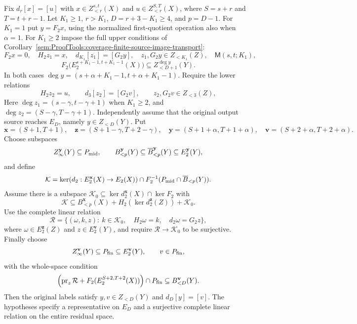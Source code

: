 \begin{corollary}
\label{sem:ProofTools:coverage-bottom-recursive-differential}

Fix $d_r[x]=[u]$ with $x\in Z_{<r}^{s,t}(X)$ and
$u\in Z_{<r}^{S,T}(X)$, where $S=s+r$ and $T=t+r-1$.
Let $K_1\ge1$, $r>K_1$, $D=r+3-K_1\ge4$, and $p=D-1$.
For $K_1=1$ put $y=F_2x$, using the normalized first-quotient
operation also when $\alpha=1$. For $K_1\ge2$ impose the full upper
conditions of Corollary~\ref{sem:ProofTools:coverage-finite-source-image-transport}:
\[
F_2x=0,\quad H_2z_1=x,\quad d_{K_1}[z_1]=[G_2y],\quad
z_1,G_2y\in Z_{<K_1}(Z),\quad \mathsf M(s,t;K_1),
\]
\[
F_2\bigl(E_2^{s+K_1-1,t+K_1-1}(X)\bigr)
 \subseteq Z_{<D+1}^{\deg y}(Y).
\]
In both cases $\deg y=(s+\alpha+K_1-1,t+\alpha+K_1-1)$.
Require the lower relations
\[
H_2z_2=u,\qquad d_3[z_2]=[G_2v],\qquad
z_2,G_2v\in Z_{<3}(Z),
\]
Here $\deg z_1=(s-\gamma,t-\gamma+1)$ when $K_1\ge2$,
and $\deg z_2=(S-\gamma,T-\gamma+1)$. Independently assume
that the original output source reaches $E_D$, namely
$y\in Z_{<D}(Y)$.
Put
\[
\mathbf x=(S+1,T+1),\quad
\mathbf z=(S+1-\gamma,T+2-\gamma),\quad
\mathbf y=(S+1+\alpha,T+1+\alpha),\quad
\mathbf v=(S+2+\alpha,T+2+\alpha).
\]
Choose subspaces
\[
Z_\infty^{\mathbf y}(Y)\subseteq P_{\rm mid},\qquad
B_{<p}^{\mathbf y}(Y)\subseteq\overline B_{<p}^{\mathbf y}(Y)
 \subseteq E_2^{\mathbf y}(Y),
\]
and define
\[
\mathcal K=\ker(d_2:E_2^{\mathbf x}(X)\to E_2(X))
 \cap F_2^{-1}(P_{\rm mid}\cap\overline B_{<p}(Y)).
\]
Assume there is a subspace
$\mathcal K_0\subseteq\ker d_2^{\mathbf x}(X)\cap\ker F_2$
with
\[
\mathcal K\subseteq B_{<p}^{\mathbf x}(X)
 +H_2(\ker d_2^{\mathbf z}(Z))+\mathcal K_0.
\]
Use the complete linear relation
\[
\mathcal R=\{(\omega,k,z):\ k\in\mathcal K_0,\quad
 H_2\omega=k,\quad d_2\omega=G_2z\},
\]
where $\omega\in E_2^{\mathbf z}(Z)$ and
$z\in E_2^{\mathbf v}(Y)$, and require
$\mathcal R\to\mathcal K_0$ to be surjective. Finally choose
\[
Z_\infty^{\mathbf v}(Y)\subseteq P_{\rm fin}\subseteq E_2^{\mathbf v}(Y),
\qquad v\in P_{\rm fin},
\]
with the whole-space condition
\[
\left(\operatorname{pr}_z\mathcal R+
 F_2(E_2^{S+2,T+2}(X))\right)\cap P_{\rm fin}
 \subseteq B_{<D}^{\mathbf v}(Y).
\]
Then the original labels satisfy $y,v\in Z_{<D}(Y)$ and
$d_D[y]=[v]$. The hypotheses specify a representative on $E_D$ and a surjective
complete linear relation on the entire residual space.
\end{corollary}
